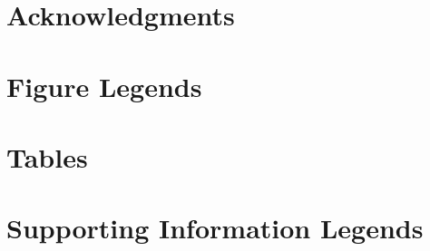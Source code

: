 
\section*{Acknowledgments}





%
%
% 

\section*{Figure Legends}
%


\section*{Tables}
% 
%
%

\section*{Supporting Information Legends}
%
% 




